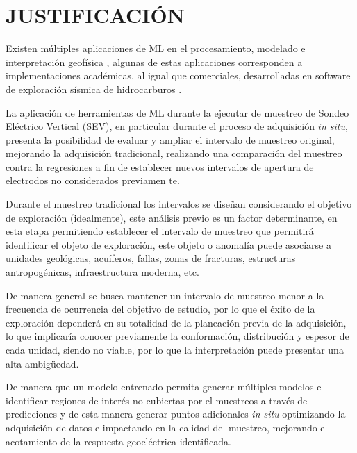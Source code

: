 \chapter{JUSTIFICACIÓN}

Existen múltiples aplicaciones de ML en el procesamiento, modelado e interpretación geofísica \citep{li2024, liu2020,el2001,wrona2018}, algunas de estas aplicaciones corresponden a implementaciones académicas, al igual que comerciales, desarrolladas en software de exploración sísmica de hidrocarburos \citep{diaferia2024high, panebianco2024automated}.



La aplicación de herramientas de ML durante la ejecutar de muestreo de Sondeo Eléctrico Vertical (SEV), en particular durante el proceso de adquisición \textit{in situ}, presenta la posibilidad de evaluar y ampliar el intervalo de muestreo original, mejorando la adquisición tradicional, realizando una comparación del muestreo contra la regresiones a fin de establecer nuevos intervalos de apertura de electrodos no considerados previamen te.

Durante el muestreo tradicional los intervalos se diseñan considerando el objetivo de exploración (idealmente), este análisis previo es un factor determinante, en esta etapa permitiendo establecer el intervalo de muestreo que permitirá identificar el objeto de exploración, este objeto o anomalía puede asociarse a unidades geológicas, acuíferos, fallas, zonas de fracturas, estructuras antropogénicas, infraestructura moderna, etc.

De manera general se busca mantener un intervalo de muestreo menor a la frecuencia de ocurrencia del objetivo de estudio, por lo que el éxito de la exploración dependerá en su totalidad de la planeación previa de la adquisición, lo que implicaría conocer previamente la conformación, distribución y espesor de cada unidad, siendo no viable, por lo que la interpretación puede presentar una alta ambigüedad.

De manera que un modelo entrenado permita generar múltiples modelos e identificar regiones de interés no cubiertas por el muestreos a través de predicciones y de esta manera generar puntos adicionales \textit{in situ} optimizando la adquisición de datos e impactando en la calidad del muestreo, mejorando el acotamiento de la respuesta geoeléctrica identificada.


